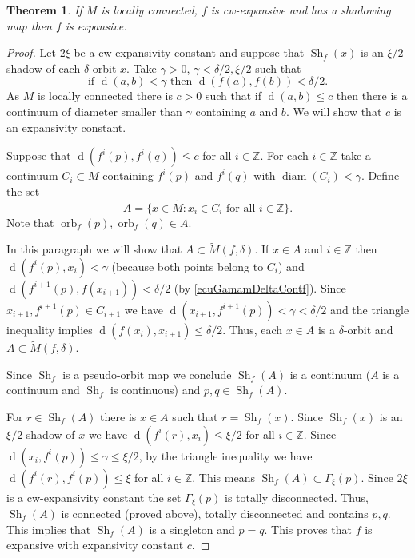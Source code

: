 \documentclass[12pt]{amsart}
\theoremstyle{plain}
\newtheorem{thm}{Theorem}[section]
\theoremstyle{definition}
\theoremstyle{remark}
\DeclareMathOperator{\diam}{diam}
\DeclareMathOperator{\dist}{d}
\DeclareMathOperator{\orb}{orb}
\DeclareMathOperator{\shm}{Sh}
\newcommand{\Z}{\mathbb Z}
\renewcommand{\epsilon}{\varepsilon}
\newcommand{\expc}{\xi}
\newcommand{\tM}{\tilde{M}}
\newcommand{\azul}[1]{\textcolor{blue}{#1}}
\begin{document}

\begin{thm}
	\label{thmShmCwExpImpExp}
	If $M$ is locally connected, $f$ is cw-expansive and has a shadowing map then $f$ is expansive.
\end{thm}

\begin{proof}
	Let $2\expc$ be a cw-expansivity constant and suppose that $\shm_f(x)$ is an $\expc/2$-shadow of each $\delta$-orbit $x$.
	Take $\gamma>0$, $\gamma<\delta/2,\expc/2$ such that
	\begin{equation}
		\label{ecuGamamDeltaContf}
		\text{if $\dist(a,b)<\gamma$ then $\dist(f(a),f(b))<\delta/2$.}
	\end{equation}
	As $M$ is locally connected there is $c>0$ such that if $\dist(a,b)\leq c$ then there is a continuum of diameter smaller than $\gamma$ containing $a$ and $b$.
	We will show that $c$ is an expansivity constant.

	Suppose that $\dist(f^i(p),f^i(q))\leq c$ for all $i\in\Z$.
	For each $i\in\Z$ take a continuum $C_i\subset M$ containing $f^i(p)$ and $f^i(q)$ with $\diam(C_i)<\gamma$.
	Define the set
	\[
	A=\{x\in \tM:x_i\in C_i\text{ for all } i\in\Z\}.
	\]
	Note that $\orb_f(p),\orb_f(q)\in A$.

	In this paragraph we will show that $A\subset \tM(f,\delta)$.
	If $x\in A$ and $i\in\Z$ then
	$\dist(f^i(p),x_i)<\gamma$ (because both points belong to $C_i$) and $\dist(f^{i+1}(p),f(x_{i+1}))<\delta/2$ (by \eqref{ecuGamamDeltaContf}).
	Since $x_{i+1}, f^{i+1}(p)\in C_{i+1}$ we have $\dist(x_{i+1}, f^{i+1}(p))<\gamma<\delta/2$ and the triangle inequality implies $\dist(f(x_i),x_{i+1})\leq\delta/2$.
	Thus, each $x\in A$ is a $\delta$-orbit and $A\subset \tM(f,\delta)$.

	Since $\shm_f$ is a pseudo-orbit map we conclude $\shm_f(A)$ is a continuum ($A$ is a continuum and $\shm_f$ is continuous) and $p,q\in\shm_f(A)$.

	For $r\in \shm_f(A)$ there is $x\in A$ such that $r=\shm_f(x)$.
	Since $\shm_f(x)$ is an $\expc/2$-shadow of $x$ we have
	$\dist(f^i(r),x_i)\leq\expc/2$ for all $i\in\Z$.
	Since $\dist(x_i,f^i(p))\leq\gamma\leq\expc/2$,
	by the triangle inequality we have $\dist(f^i(r),f^i(p))\leq\expc$ for all $i\in\Z$.
	This means $\shm_f(A)\subset\Gamma_\expc(p)$. Since $2\expc$ is a cw-expansivity constant the set $\Gamma_\expc(p)$ is totally disconnected. Thus, $\shm_f(A)$ is connected (proved above), totally disconnected and contains $p,q$.
	This implies that $\shm_f(A)$ is a singleton and $p=q$. This proves that $f$ is expansive with expansivity constant $c$.
\end{proof}
\end{document}
